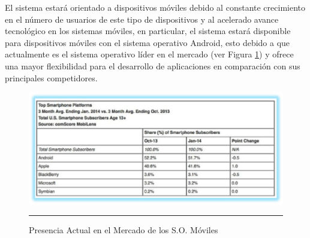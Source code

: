 El sistema estará orientado a dispositivos móviles debido al constante crecimiento en el número de usuarios de este tipo de dispositivos y al acelerado avance tecnológico en los sistemas móviles, en particular, el sistema estará disponible para dispositivos móviles con el sistema operativo Android, esto debido a que actualmente es el sistema operativo líder en el mercado (ver Figura \ref{fig:moviles})\cite{moviles} y ofrece una mayor flexibilidad para el desarrollo de aplicaciones en comparación con sus principales competidores.

\begin{figure}[htbp]
	\centering
		\includegraphics{Figuras/moviles.png}
		\rule{35em}{0.5pt}
	\caption[Mercado de los S.O. Móviles]{Presencia Actual en el Mercado de los S.O. Móviles}
	\label{fig:moviles}
\end{figure}